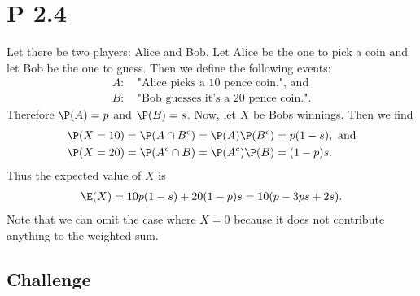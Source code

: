 \documentclass{article}
\begin{document}
\section*{P 2.4}


Let there be two players: Alice and Bob. Let Alice be the one to pick
a coin and let Bob be the one to guess. Then we define the following
events:
\begin{align*}
  A: & \:\text{"Alice picks a 10 pence coin.", and}  \\
  B: & \:\text{"Bob guesses it's a 20 pence coin."}.
\end{align*}
Therefore $\P(A)=p$ and $\P(B)=s$.
Now, let $X$ be Bobs winnings. Then we find
\begin{align*}
  \P(X=10) & = \P(A\cap B^c) = \P(A)\P(B^c) = p(1-s),\text{ and} \\
  \P(X=20) & = \P(A^c\cap B) = \P(A^c)\P(B) = (1-p)s.
\end{align*}
Thus the expected value of $X$ is
\begin{align*}
  \E(X) = 10p(1-s)+20(1-p)s = 10(p - 3ps + 2s).
\end{align*}
Note that we can omit the case where $X=0$ because it does
not contribute anything to the weighted sum.

\subsection*{Challenge}
\end{document}
